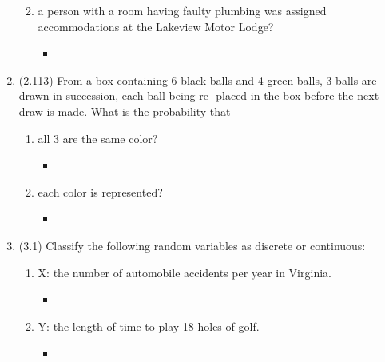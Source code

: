 \documentclass[basic, header]{nosvagor-notes}
\begin{document}
\begin{enumerate}[itemsep=7em]
\begin{enumerate}
\begin{itemize}
        \end{itemize}

      \item a person with a room having faulty plumbing was assigned
        accommodations at the Lakeview Motor Lodge?
        \begin{itemize}
          \item

        \end{itemize}

    \end{enumerate}

  \newpage %

  \item (2.113) From a box containing 6 black balls and 4 green balls, 3 balls
    are drawn in succession, each ball being re- placed in the box before the
    next draw is made. What is the probability that
    \begin{enumerate}

      \item all 3 are the same color?
        \begin{itemize}
          \item

        \end{itemize}

      \item each color is represented?
        \begin{itemize}
          \item

        \end{itemize}

    \end{enumerate}

  \item (3.1) Classify the following random variables as discrete or
    continuous:

    \begin{enumerate}[label={}, leftmargin=0em]

      \item X: the number of automobile accidents per year in Virginia.
        \begin{itemize}
          \item

        \end{itemize}
      \item Y: the length of time to play 18 holes of golf.
        \begin{itemize}
          \item


\end{itemize}
\end{enumerate}
\end{enumerate}
\end{document}
